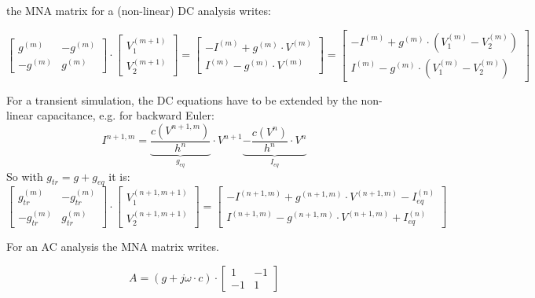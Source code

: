 the MNA matrix for a (non-linear) DC analysis writes:

\begin{equation}
\begin{bmatrix}
 g^{(m)} & -g^{(m)}\\
-g^{(m)} &  g^{(m)}
\end{bmatrix}
\cdot
\begin{bmatrix}
V_{1}^{(m+1)}\\
V_{2}^{(m+1)}
\end{bmatrix}
=
\begin{bmatrix}
-I^{(m)} + g^{(m)}\cdot V^{(m)}\\
 I^{(m)} - g^{(m)}\cdot V^{(m)}
\end{bmatrix}
=
\begin{bmatrix}
-I^{(m)} + g^{(m)}\cdot (V_1^{(m)} - V_2^{(m)})\\
 I^{(m)} - g^{(m)}\cdot (V_1^{(m)} - V_2^{(m)})
\end{bmatrix}
\end{equation}

For a transient simulation, the DC equations have to be extended
by the non-linear capacitance, e.g. for backward Euler:
\begin{equation}
I^{n+1,m} = \underbrace{\dfrac{c(V^{n+1,m})}{h^n}}_{g_{eq}}\cdot V^{n+1}
            \underbrace{- \dfrac{c(V^{n})}{h^n}\cdot V^{n}}_{I_{eq}}
\end{equation}
So with $g_{tr} = g + g_{eq}$ it is:
\begin{equation}
\begin{bmatrix}
 g_{tr}^{(m)} & -g_{tr}^{(m)}\\
-g_{tr}^{(m)} &  g_{tr}^{(m)}
\end{bmatrix}
\cdot
\begin{bmatrix}
V_{1}^{(n+1,m+1)}\\
V_{2}^{(n+1,m+1)}
\end{bmatrix}
=
\begin{bmatrix}
-I^{(n+1,m)} + g^{(n+1,m)}\cdot V^{(n+1,m)} - I_{eq}^{(n)}\\
 I^{(n+1,m)} - g^{(n+1,m)}\cdot V^{(n+1,m)} + I_{eq}^{(n)}
\end{bmatrix}
\end{equation}

For an AC analysis the MNA matrix writes.

\begin{equation}
A = (g + j\omega\cdot c)\cdot
\begin{bmatrix}
 1 & -1\\
-1 &  1
\end{bmatrix}
\end{equation}

